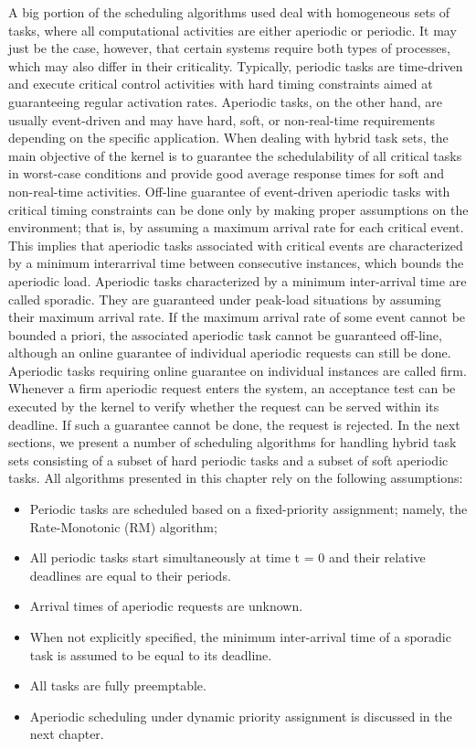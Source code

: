 \documentclass[conference]{IEEEtran}
\begin{document}
A big portion of the scheduling algorithms used deal with homogeneous
sets of tasks, where all computational activities are either aperiodic or periodic. It may just be the case, however, that certain systems require both types of processes, which may
also differ in their criticality. Typically, periodic tasks are time-driven and execute
critical control activities with hard timing constraints aimed at guaranteeing regular
activation rates. Aperiodic tasks, on the other hand, are usually event-driven and may have hard, soft, or
non-real-time requirements depending on the specific application.
When dealing with hybrid task sets, the main objective of the kernel is to guarantee the
schedulability of all critical tasks in worst-case conditions and provide good average
response times for soft and non-real-time activities. Off-line guarantee of event-driven
aperiodic tasks with critical timing constraints can be done only by making proper
assumptions on the environment; that is, by assuming a maximum arrival rate for
each critical event. This implies that aperiodic tasks associated with critical events are
characterized by a minimum interarrival time between consecutive instances, which
bounds the aperiodic load. Aperiodic tasks characterized by a minimum inter-arrival
time are called sporadic. They are guaranteed under peak-load situations by assuming
their maximum arrival rate.
If the maximum arrival rate of some event cannot be bounded a priori, the associated
aperiodic task cannot be guaranteed off-line, although an online guarantee of individual aperiodic requests can still be done. Aperiodic tasks requiring online guarantee
on individual instances are called firm. Whenever a firm aperiodic request enters the
system, an acceptance test can be executed by the kernel to verify whether the request can be served within its deadline. If such a guarantee cannot be done, the request is
rejected.
In the next sections, we present a number of scheduling algorithms for handling hybrid
task sets consisting of a subset of hard periodic tasks and a subset of soft aperiodic
tasks. All algorithms presented in this chapter rely on the following assumptions:
	\begin{itemize}
	\item Periodic tasks are scheduled based on a fixed-priority assignment; namely, the
	Rate-Monotonic (RM) algorithm;
	\item All periodic tasks start simultaneously at time t = 0 and their relative deadlines
	are equal to their periods.
	\item Arrival times of aperiodic requests are unknown.
	\item When not explicitly specified, the minimum inter-arrival time of a sporadic task is
	assumed to be equal to its deadline.
	\item All tasks are fully preemptable.
	\item Aperiodic scheduling under dynamic priority assignment is discussed in the next chapter.
\end{itemize}
\end{document}
